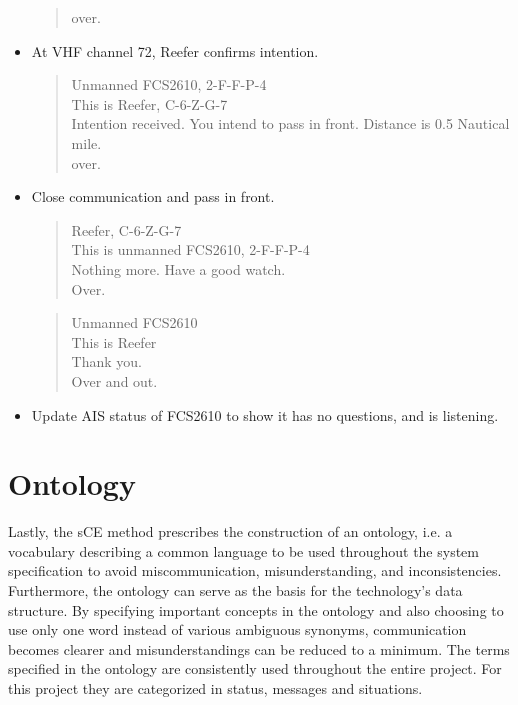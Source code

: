 \begin{itemize}
\begin{quote}
		over.
	\end{quote}
	\item At \ac{VHF} channel 72, Reefer confirms intention.
	\begin{quote}
		Unmanned FCS2610, 2-F-F-P-4 \\
		This is Reefer, C-6-Z-G-7\\
		Intention received. You intend to pass in front. Distance is 0.5 Nautical mile.\\
		over.
	\end{quote}
	\item Close communication and pass in front.
	\begin{quote}
		Reefer, C-6-Z-G-7\\
		This is unmanned FCS2610, 2-F-F-P-4 \\
		Nothing more. Have a good watch. \\
		Over.
	\end{quote}
	\begin{quote}
		Unmanned FCS2610\\
		This is Reefer\\
		Thank you. \\
		Over and out.
	\end{quote}
	\item Update AIS status of FCS2610 to show it has no questions, and is listening.
\end{itemize}

\section{Ontology}
Lastly, the sCE method prescribes the construction of an ontology, i.e. a vocabulary describing a common language to be used throughout the system specification to avoid miscommunication, misunderstanding, and inconsistencies. Furthermore, the ontology can serve as the basis for the technology’s data structure. By specifying important concepts in the ontology and also choosing to use only one word instead of various ambiguous synonyms, communication becomes clearer and misunderstandings can be reduced to a minimum. The terms specified in the ontology are consistently used throughout the entire project. For this project they are categorized in status, messages and situations.

